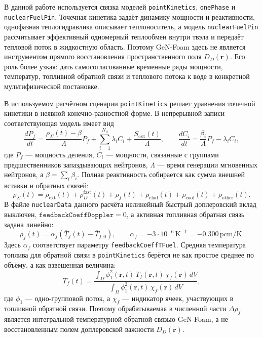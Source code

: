\documentclass[12pt]{article}
\begin{document}
В данной работе используется связка моделей \texttt{pointKinetics}, \texttt{onePhase} и \texttt{nuclearFuelPin}. Точечная кинетика задаёт динамику мощности и реактивности, однофазная теплогидравлика описывает теплоноситель, а модель \texttt{nuclearFuelPin} рассчитывает эффективный одномерный теплообмен внутри твэла и передаёт тепловой поток в жидкостную область. Поэтому GeN-Foam здесь не является инструментом прямого восстановления пространственного поля \(D_D(\mathbf r)\). Его роль более узкая: дать самосогласованные временные ряды мощности, температур, топливной обратной связи и теплового потока к воде в конкретной мультифизической постановке.

В используемом расчётном сценарии \texttt{pointKinetics} решает уравнения точечной кинетики в неявной конечно-разностной форме. В непрерывной записи соответствующая модель имеет вид
\[
\frac{dP_f}{dt}
=
\frac{\rho_\Sigma(t)-\beta}{\Lambda}P_f
+\sum_{i=1}^{N_d}\lambda_iC_i
+\frac{S_{\mathrm{ext}}(t)}{\Lambda},
\qquad
\frac{dC_i}{dt}
=
\frac{\beta_i}{\Lambda}P_f-\lambda_iC_i,
\]
где \(P_f\) --- мощность деления, \(C_i\) --- мощности, связанные с группами предшественников запаздывающих нейтронов, \(\Lambda\) --- время генерации мгновенных нейтронов, а \(\beta=\sum_i\beta_i\). Полная реактивность собирается как сумма внешней вставки и обратных связей:
\[
\rho_\Sigma(t)
=
\rho_{\mathrm{ext}}(t)
+\rho_D^{\mathrm{fast}}(t)
+\rho_f(t)
+\rho_{\mathrm{clad}}(t)
+\rho_{\mathrm{cool}}(t)
+\rho_{\mathrm{other}}(t).
\]
В файле \texttt{nuclearData} данного расчёта нелинейный быстрый доплеровский вклад выключен,
\(\texttt{feedbackCoeffDoppler}=0\), а активная топливная обратная связь задана линейно:
\[
\rho_f(t)=\alpha_f\left(\overline T_f(t)-\overline T_{f,0}\right),
\qquad
\alpha_f=-3\cdot10^{-6}\,\mathrm{K^{-1}}
=-0.300\,\mathrm{pcm/K}.
\]
Здесь \(\alpha_f\) соответствует параметру \texttt{feedbackCoeffTFuel}.
Средняя температура топлива для обратной связи в \texttt{pointKinetics} берётся не как простое среднее по объёму, а как взвешенная величина:
\[
\overline T_f(t)
=
\frac{\int_\Omega \phi_1^2(\mathbf r,t)\,T_f(\mathbf r,t)\,\chi_f(\mathbf r)\,dV}
{\int_\Omega \phi_1^2(\mathbf r,t)\,\chi_f(\mathbf r)\,dV},
\]
где \(\phi_1\) --- одно-групповой поток, а \(\chi_f\) --- индикатор ячеек, участвующих в топливной обратной связи. Поэтому обрабатываемая в численной части \(\Delta\rho_f\) является интегральной температурной обратной связью GeN-Foam, а не восстановленным полем доплеровской важности \(D_D(\mathbf r)\).
\end{document}
